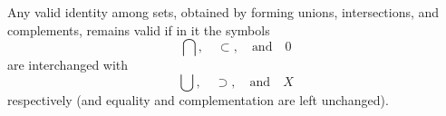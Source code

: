 Any valid identity among sets, obtained by forming unions, intersections, and complements, remains valid if in it the symbols
$$\bigcap, \quad \subset, \quad \text{and} \quad 0$$
are interchanged with
$$\bigcup, \quad \supset, \quad \text{and} \quad X$$
respectively (and equality and complementation are left unchanged).
